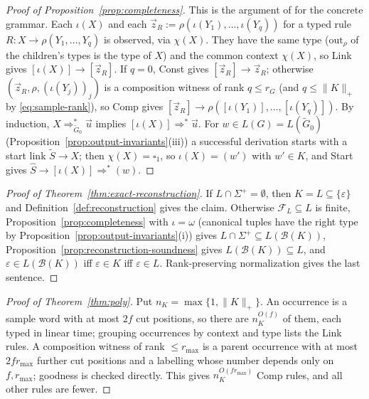 \documentclass[11pt]{article}
\numberwithin{equation}{section}
\theoremstyle{plain}
\theoremstyle{definition}
\theoremstyle{remark}
\newcommand{\out}{\mathrm{out}}
\newcommand{\tuple}[1]{\vec{#1}}
\newcommand{\blank}{\square}
\newcommand{\eps}{\varepsilon}
\begin{document}
\begin{proof}[Proof of Proposition~\ref{prop:completeness}]
This is the argument of \cite[Lemma~3]{Yoshinaka2015General} for the concrete
grammar.  Each $\iota(X)$ and each
$\tuple z_R:=\rho(\iota(Y_1),\ldots,\iota(Y_q))$ for a typed rule
$R:X\to\rho(Y_1,\ldots,Y_q)$ is observed, via $\chi(X)$.  They have the same type
($\out_\rho$ of the children's types is the type of $X$) and the common context
$\chi(X)$, so Link gives $[\iota(X)]\to[\tuple z_R]$.  If $q=0$, Const gives
$[\tuple z_R]\to\tuple z_R$; otherwise $(\tuple z_R,\rho,(\iota(Y_j))_j)$ is a
composition witness of rank $q\le r_G$ (and $q\le\|K\|_+$ by \eqref{eq:sample-rank}),
so Comp gives $[\tuple z_R]\to\rho([\iota(Y_1)],\ldots,[\iota(Y_q)])$.  By induction,
$X\Rightarrow^*_{\widetilde G_0}\tuple u$ implies $[\iota(X)]\Rightarrow^*\tuple u$.  For
$w\in L(G)=L(\widetilde G_0)$ (Proposition~\ref{prop:output-invariants}(iii)) a
successful derivation starts with a start link $\widetilde S\to X$; then
$\chi(X)=\blank_1$, so $\iota(X)=(w')$ with $w'\in K$, and Start gives
$\widehat S\to[\iota(X)]\Rightarrow^*(w)$.
\end{proof}

\begin{proof}[Proof of Theorem~\ref{thm:exact-reconstruction}]
If $L\cap\Sigma^+=\emptyset$, then $K=L\subseteq\{\eps\}$ and
Definition~\ref{def:reconstruction} gives the claim.  Otherwise $\mathcal F_L\subseteq L$
is finite, Proposition~\ref{prop:completeness} with $\iota=\omega$ (canonical tuples have
the right type by Proposition~\ref{prop:output-invariants}(i)) gives
$L\cap\Sigma^+\subseteq L(\mathcal B(K))$, Proposition~\ref{prop:reconstruction-soundness}
gives $L(\mathcal B(K))\subseteq L$, and $\eps\in L(\mathcal B(K))$ iff $\eps\in K$ iff
$\eps\in L$.  Rank-preserving normalization gives the last sentence.
\end{proof}

\begin{proof}[Proof of Theorem~\ref{thm:poly}]
Put $n_K=\max\{1,\|K\|_+\}$.  An occurrence is a sample word with at most $2f$ cut
positions, so there are $n_K^{O(f)}$ of them, each typed in linear time; grouping
occurrences by context and type lists the Link rules.  A composition witness of rank
$\le r_{\max}$ is a parent occurrence with at most $2fr_{\max}$ further cut positions
and a labelling whose number depends only on $f,r_{\max}$; goodness is checked
directly.  This gives $n_K^{O(fr_{\max})}$ Comp rules, and all other rules are fewer.
\end{proof}
\end{document}
